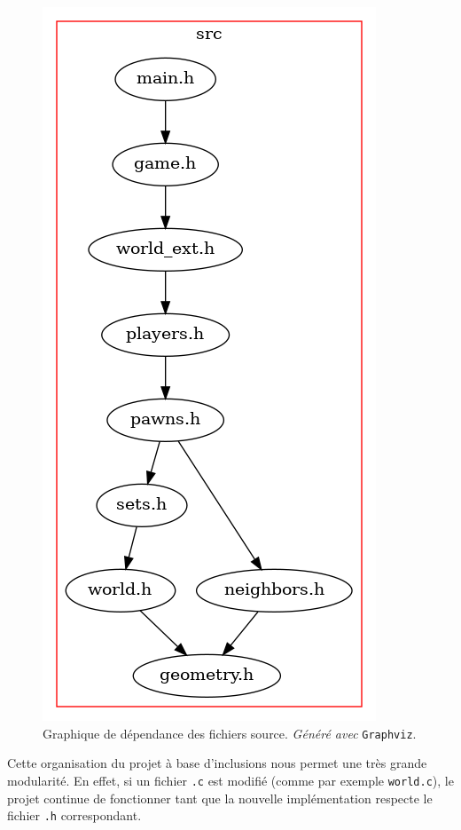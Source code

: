         \begin{figure}[H]
            \centering
            \includegraphics[scale=0.4]{img/graph_src.png}
            \caption{Graphique de dépendance des fichiers source. \textit{Généré avec} \texttt{Graphviz}.}
            \label{fig:graph_src}
        \end{figure}

        Cette organisation du projet à base d'inclusions nous permet une très grande modularité. En effet, si un fichier \texttt{.c} est modifié (comme par exemple \texttt{world.c}), le projet continue de fonctionner tant que la nouvelle implémentation respecte le fichier \texttt{.h} correspondant.

